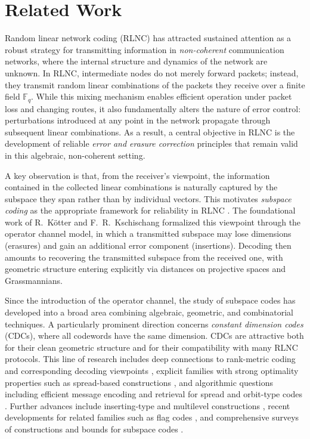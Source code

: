 \documentclass{svproc}
\begin{document}
\section{Related Work} \label{sec:preliminaries}
Random linear network coding (RLNC) has attracted sustained attention as a robust
strategy for transmitting information in \emph{non-coherent} communication
networks, where the internal structure and dynamics of the network are unknown.
In RLNC, intermediate nodes do not merely forward packets; instead, they transmit
random linear combinations of the packets they receive over a finite field
$\mathbb{F}_q$. While this mixing mechanism enables efficient operation under
packet loss and changing routes, it also fundamentally alters the nature of error
control: perturbations introduced at any point in the network propagate through
subsequent linear combinations. As a result, a central objective in RLNC is the
development of reliable \emph{error and erasure correction} principles that remain
valid in this algebraic, non-coherent setting.

A key observation is that, from the receiver’s viewpoint, the information
contained in the collected linear combinations is naturally captured by the
subspace they span rather than by individual vectors. This motivates
\emph{subspace coding} as the appropriate framework for reliability in RLNC
\cite{koetter2008coding}. The foundational work of R.~K\"otter and
F.~R.~Kschischang \cite{koetter2008coding} formalized this viewpoint through the
operator channel model, in which a transmitted subspace may lose dimensions
(erasures) and gain an additional error component (insertions). Decoding then
amounts to recovering the transmitted subspace from the received one, with
geometric structure entering explicitly via distances on projective spaces and
Grassmannians.

Since the introduction of the operator channel, the study of subspace codes has
developed into a broad area combining algebraic, geometric, and combinatorial
techniques. A particularly prominent direction concerns \emph{constant dimension
codes} (CDCs), where all codewords have the same dimension. CDCs are attractive
both for their clean geometric structure and for their compatibility with many
RLNC protocols. This line of research includes deep connections to rank-metric
coding and corresponding decoding viewpoints \cite{silva2008rank,bartz2022rankmetric},
explicit families with strong optimality properties such as spread-based
constructions \cite{manganiello2008spread,manganiello2011spread}, and algorithmic
questions including efficient message encoding and retrieval for spread and
orbit-type codes \cite{trautmann2014message,horlemann2018message}. Further advances
include inserting-type and multilevel constructions \cite{heinlein2023improved,li2025inserting},
recent developments for related families such as flag codes \cite{han2025flag},
and comprehensive surveys of constructions and bounds for subspace codes
\cite{kurz2025bounds}.
\end{document}

